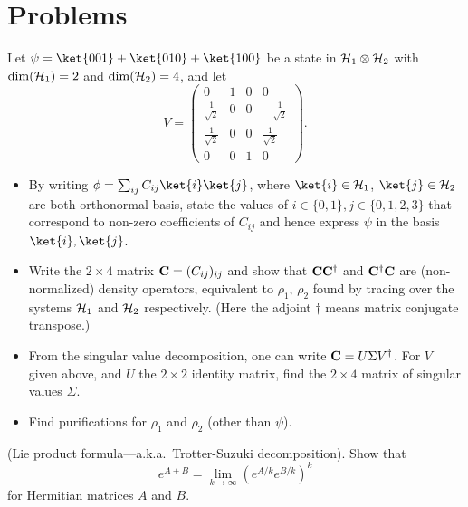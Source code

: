 \section{Problems} 

\begin{myexercise}\label{exercise:svd1}
Let $\psi = \ket{001}+\ket{010}+\ket{100}$ be a state in $\mathcal{H}_1\otimes\mathcal{H}_2$ with $\dim(\mathcal{H}_1)=2$ and $\dim(\mathcal{H}_2)=4$, and let  
\begin{equation}
 V = \left(
\begin{array}{cccc}
 0 & 1 & 0 & 0 \\
 \frac{1}{\sqrt{2}} & 0 & 0 & -\frac{1}{\sqrt{2}} \\
 \frac{1}{\sqrt{2}} & 0 & 0 & \frac{1}{\sqrt{2}} \\
 0 & 0 & 1 & 0
\end{array}
\right).
\end{equation}
\begin{itemize}
 \item[(i)] By writing $\phi = \sum_{ij}C_{ij}\ket{i}\ket{j}$, where $\ket{i}\in\hilb H_1$, $\ket{j}\in\hilb H_2$ are both orthonormal basis, state the values of $i\in\{0,1\},j\in\{0,1,2,3\}$ that correspond to non-zero coefficients of $C_{ij}$ and hence express $\psi$ in the basis $\ket{i},\ket{j}$.    
  \item[(ii)]  Write the $2\times 4$ matrix ${\bf C}=(C_{ij})_{ij}$ and show that ${\bf C}{\bf C}^\dagger$ and ${\bf C}^\dagger {\bf C}$ are (non-normalized) density operators, equivalent to $\rho_1$, $\rho_2$ found by tracing over the systems $\mathcal{H}_1$ and $\mathcal{H}_2$ respectively.  (Here the adjoint $\dagger$ means matrix conjugate transpose.)
 \item [(iii)] From the singular value decomposition, one can write ${\bf C}=U\Sigma V^\dagger$.  For $V$ given above, and $U$ the $2\times 2$ identity matrix, find the $2\times 4$ matrix of singular values $\Sigma$.  
 \item[(iv)] Find purifications for $\rho_1$ and $\rho_2$ (other than $\psi$).  
\end{itemize}
\end{myexercise} 


\begin{myexercise}(Lie product formula---a.k.a.~Trotter-Suzuki decomposition). Show that 
\begin{equation}
e^{A + B}=\lim_{k\rightarrow \infty} \left(e^{A/k}e^{B/k} \right)^k
\end{equation}
for Hermitian matrices $A$ and $B$. 
\end{myexercise}


